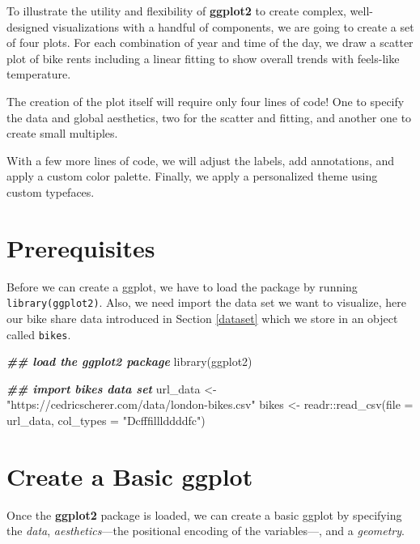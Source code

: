\documentclass[
]{krantz}
\makeatletter
\newenvironment{Shaded}{\begin{snugshade}}{\end{snugshade}}
\newcommand{\AttributeTok}[1]{\textcolor[rgb]{0.61,0.61,0.61}{#1}}
\newcommand{\DocumentationTok}[1]{\textcolor[rgb]{0.37,0.37,0.37}{\textbf{\textit{#1}}}}
\newcommand{\FunctionTok}[1]{\textcolor[rgb]{0,0,0}{#1}}
\newcommand{\NormalTok}[1]{#1}
\newcommand{\OtherTok}[1]{\textcolor[rgb]{0.37,0.37,0.37}{#1}}
\newcommand{\SpecialCharTok}[1]{\textcolor[rgb]{0,0,0}{#1}}
\newcommand{\StringTok}[1]{\textcolor[rgb]{0.5,0.5,0.5}{#1}}
\newenvironment{kframe}{%
\medskip{}
\setlength{\fboxsep}{.8em}
 \def\at@end@of@kframe{}%
 \ifinner\ifhmode%
  \def\at@end@of@kframe{\end{minipage}}%
  \begin{minipage}{\columnwidth}%
 \fi\fi%
 \def\FrameCommand##1{\hskip\@totalleftmargin \hskip-\fboxsep
 \colorbox{shadecolor}{##1}\hskip-\fboxsep
     \hskip-\linewidth \hskip-\@totalleftmargin \hskip\columnwidth}%
 \MakeFramed {\advance\hsize-\width
   \@totalleftmargin\z@ \linewidth\hsize
   \@setminipage}}%
 {\par\unskip\endMakeFramed%
 \at@end@of@kframe}
\renewenvironment{Shaded}{\begin{kframe}}{\end{kframe}}
\makeatother
\begin{document}
To illustrate the utility and flexibility of \textbf{ggplot2} to create complex, well-designed visualizations with a handful of components, we are going to create a set of four plots. For each combination of year and time of the day, we draw a scatter plot of bike rents including a linear fitting to show overall trends with feels-like temperature.

The creation of the plot itself will require only four lines of code! One to specify the data and global aesthetics, two for the scatter and fitting, and another one to create small multiples.

With a few more lines of code, we will adjust the labels, add annotations, and apply a custom color palette. Finally, we apply a personalized theme using custom typefaces.

\hypertarget{prep-ggplot}{%
\section{Prerequisites}\label{prep-ggplot}}

Before we can create a ggplot, we have to load the package by running \texttt{library(ggplot2)}. Also, we need import the data set we want to visualize, here our bike share data introduced in Section \ref{dataset} which we store in an object called \texttt{bikes}.

\begin{Shaded}
\begin{Highlighting}[]
\DocumentationTok{\#\# load the ggplot2 package}
\FunctionTok{library}\NormalTok{(ggplot2)}

\DocumentationTok{\#\# import bikes data set}
\NormalTok{url\_data }\OtherTok{\textless{}{-}} \StringTok{"https://cedricscherer.com/data/london{-}bikes.csv"}
\NormalTok{bikes }\OtherTok{\textless{}{-}}\NormalTok{ readr}\SpecialCharTok{::}\FunctionTok{read\_csv}\NormalTok{(}\AttributeTok{file =}\NormalTok{ url\_data, }\AttributeTok{col\_types =} \StringTok{"Dcfffilllddddfc"}\NormalTok{)}
\end{Highlighting}
\end{Shaded}

\hypertarget{basics}{%
\section{Create a Basic ggplot}\label{basics}}

Once the \textbf{ggplot2} package is loaded, we can create a basic ggplot by specifying the \emph{data}, \emph{aesthetics}---the positional encoding of the variables---, and a \emph{geometry}.
\end{document}
